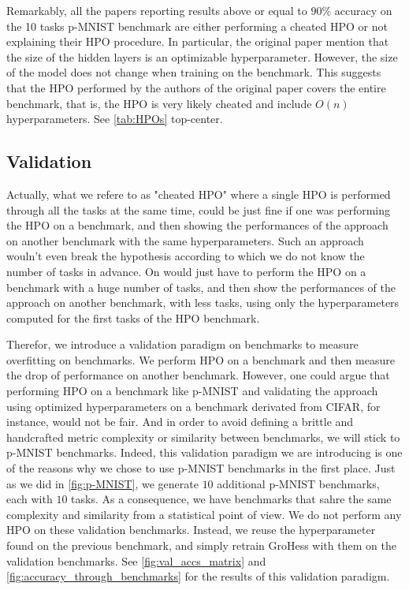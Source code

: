 \documentclass[11pt]{article}
\begin{document}
\vspace{2mm}
\noindent
Remarkably, all the papers reporting results above or equal to $90\%$ accuracy on the 10 tasks p-MNIST benchmark are either performing a cheated HPO or not explaining their HPO procedure. In particular, the original paper mention that the size of the hidden layers is an optimizable hyperparameter. However, the size of the model does not change when training on the benchmark. This suggests that the HPO performed by the authors of the original paper covers the entire benchmark, that is, the HPO is very likely cheated and include $O(n)$ hyperparameters. See \ref{tab:HPOs} top-center.


\subsection{Validation}


Actually, what we refere to as "cheated HPO" where a single HPO is performed through all the tasks at the same time, could be just fine if one was performing the HPO on a benchmark, and then showing the performances of the approach on another benchmark with the same hyperparameters. Such an approach wouln't even break the hypothesis according to which we do not know the number of tasks in advance. On would just have to perform the HPO on a benchmark with a huge number of tasks, and then show the performances of the approach on another benchmark, with less tasks, using only the hyperparameters computed for the first tasks of the HPO benchmark.

\vspace{2mm}
\noindent
Therefor, we introduce a validation paradigm on benchmarks to measure overfitting on benchmarks. We perform HPO on a benchmark and then measure the drop of performance on another benchmark. However, one could argue that performing HPO on a benchmark like p-MNIST and validating the approach using optimized hyperparameters on a benchmark derivated from CIFAR, for instance, would not be fair. And in order to avoid defining a brittle and handcrafted metric complexity or similarity between benchmarks, we will stick to p-MNIST benchmarks. Indeed, this validation paradigm we are introducing is one of the reasons why we chose to use p-MNIST benchmarks in the first place. Just as we did in \ref{fig:p-MNIST}, we generate $10$ additional p-MNIST benchmarks, each with $10$ tasks. As a consequence, we have benchmarks that sahre the same complexity and similarity from a statistical point of view. We do not perform any HPO on these validation benchmarks. Instead, we reuse the hyperparameter found on the previous benchmark, and simply retrain GroHess with them on the validation benchmarks. See \ref{fig:val_accs_matrix} and \ref{fig:accuracy_through_benchmarks} for the results of this validation paradigm.
\end{document}
